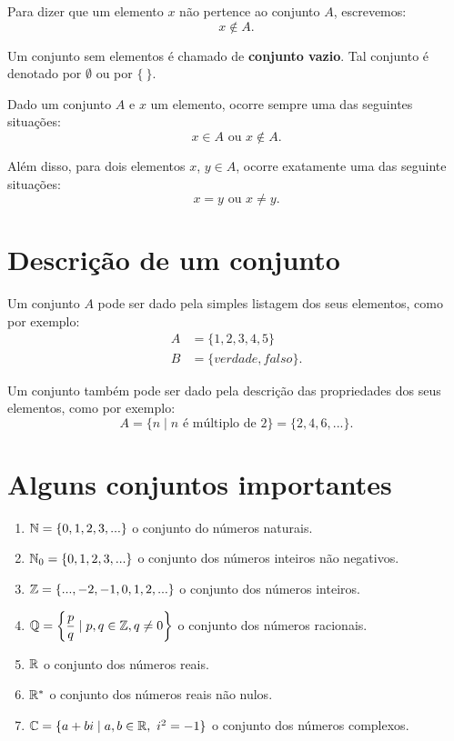 Para dizer que um elemento $x$ n{\~a}o pertence ao conjunto $A$, escrevemos:
\[
	x \notin A.
\]

Um conjunto sem elementos {\'e} chamado de \textbf{conjunto vazio}. Tal conjunto {\'e} denotado por $\emptyset$ ou por $\{\ \}$.

Dado um conjunto $A$ e $x$ um elemento, ocorre sempre uma das seguintes situa\c{c}\~oes:
\[
	x \in A \mbox{ ou } x \notin A.
\]

Al{\'e}m disso, para dois elementos $x$, $y \in A$, ocorre exatamente uma das seguinte situa\c{c}\~oes:
\[
	x = y \mbox{ ou } x \neq y.
\]

\section{Descri{\c c}{\~a}o de um conjunto}

Um conjunto $A$ pode ser dado pela simples listagem dos seus elementos, como por exemplo:
\begin{align*}
	A &= \{1,2,3,4,5\}\\
	B &= \{verdade, falso\}.
\end{align*}

Um conjunto tamb{\'e}m pode ser dado pela descri{\c c}{\~a}o das propriedades dos seus elementos, como por exemplo:
\[
	A = \{n \mid n \mbox{ \'e m{\'u}ltiplo de } 2\} = \{2,4,6,...\}.
\]

\section{Alguns conjuntos importantes}
\begin{enumerate}[label={\arabic*})]
	\item $\mathbb{N} = \{0,1,2,3,...\}$ o conjunto do n{\'u}meros naturais.
	\item $\mathbb{N}_0 = \{0,1,2,3,...\}$ o conjunto dos n{\'u}meros inteiros n{\~a}o negativos.
	\item $\mathbb{Z} = \{...,-2,-1,0,1,2,...\}$ o conjunto dos n{\'u}meros inteiros.
	\item $\mathbb{Q} = \left\{\dfrac{p}{q} \mid p,q \in \mathbb{Z}, q \neq 0 \right\}$ o conjunto dos n{\'u}meros racionais.
	\item $\mathbb{R} $ o conjunto dos n{\'u}meros reais.
	\item $\mathbb{R}^*$ o conjunto dos n{\'u}meros reais n{\~a}o nulos.
	\item $\mathbb{C} = \{a + bi \mid a,b \in \mathbb{R},\ i^2 = -1\}$ o conjunto dos n\'umeros complexos.
\end{enumerate}

